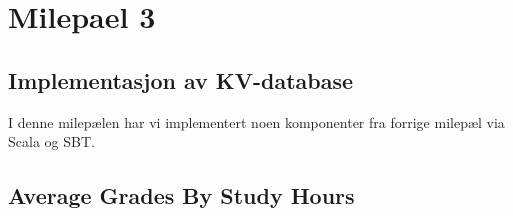 \section{Milepael 3}

\subsection{Implementasjon av KV-database}
I denne milepælen har vi implementert noen komponenter fra forrige milepæl via Scala og SBT.

\subsection{Average Grades By Study Hours}


